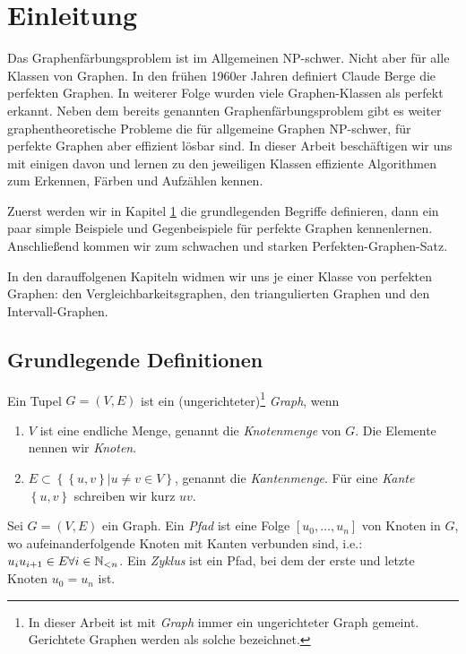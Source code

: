 \documentclass[../main.tex]{subfiles}
\begin{document}
\chapter{Einleitung}
\label{chapter:grundlagen}

Das Graphenfärbungsproblem ist im Allgemeinen NP-schwer. Nicht aber für alle Klassen von Graphen. In den frühen 1960er Jahren definiert Claude Berge die perfekten Graphen. In weiterer Folge wurden viele Graphen-Klassen als perfekt erkannt. Neben dem bereits genannten Graphenfärbungsproblem gibt es weiter graphentheoretische Probleme die für allgemeine Graphen NP-schwer, für perfekte Graphen aber effizient lösbar sind.
In dieser Arbeit beschäftigen wir uns mit einigen davon und lernen zu den jeweiligen Klassen effiziente Algorithmen zum Erkennen, Färben und Aufzählen kennen. 

Zuerst werden wir in Kapitel \ref{chapter:grundlagen} die grundlegenden Begriffe definieren, dann ein paar simple Beispiele und Gegenbeispiele für perfekte Graphen kennenlernen. Anschließend kommen wir zum schwachen und starken Perfekten-Graphen-Satz.

In den darauffolgenen Kapiteln widmen wir uns je einer Klasse von perfekten Graphen: den Vergleichbarkeitsgraphen, den triangulierten Graphen und den Intervall-Graphen.

\section{Grundlegende Definitionen}
\label{section:definitionen}

\begin{definition}
    Ein Tupel $G = (V, E)$ ist ein (ungerichteter)\footnote{In dieser Arbeit ist mit \emph{Graph} immer ein ungerichteter Graph gemeint. Gerichtete Graphen werden als solche bezeichnet.} \emph{Graph}, wenn
    \begin{enumerate}
        \item $V$ ist eine endliche Menge, genannt die \emph{Knotenmenge} von $G$. Die Elemente nennen wir \emph{Knoten}.
        \item $E \subset \left\{\left\{u, v\right\} | u \neq v \in V\right\}$, genannt die \emph{Kantenmenge}. Für eine \emph{Kante} $\left\{u, v\right\}$ schreiben wir kurz $uv$.
    \end{enumerate}
\end{definition}

\begin{definition}
    Sei $G = (V, E)$ ein Graph. Ein \emph{Pfad} ist eine Folge $[u_0, \hdots, u_n]$ von Knoten in $G$, wo aufeinanderfolgende Knoten mit Kanten verbunden sind, i.e.: $u_iu_{i+1} \in E \forall i \in \mathbb{N}_{<n}$. Ein \emph{Zyklus} ist ein Pfad, bei dem der erste und letzte Knoten $u_0 = u_n$ ist.
\end{definition}
\end{document}
